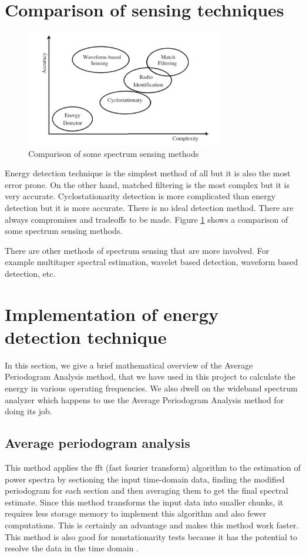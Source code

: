 \section{Comparison of sensing techniques}

\begin{figure}
\centering
\includegraphics[width=0.77\textwidth]{../images/compareSensing}
\caption[Comparison of sensing methods]{Comparison of some spectrum sensing 
methods}
\label{compareSensing}
\end{figure}

Energy detection technique is the simplest method of all but it is also the 
most error prone. On the other hand, matched filtering is the most complex but 
it is very accurate. Cyclostationarity detection is more complicated than 
energy detection but it is more accurate. There is no ideal detection method.
There are always compromises and tradeoffs to be made. Figure 
\ref{compareSensing} shows a comparison of some spectrum sensing methods.

There are other methods of spectrum sensing that are more involved. For
example multitaper spectral estimation, wavelet based detection, waveform
based detection, etc.


\section{Implementation of energy detection technique}

In this section, we give a brief mathematical overview of the Average 
Periodogram Analysis method, that we have used in this project to calculate 
the energy in various operating frequencies. We also dwell on the wideband 
spectrum analyzer which happens to use the Average Periodogram Analysis 
method for doing its job.

\subsection{Average periodogram analysis}
This method applies the \gls{fft}  (fast fourier transform) algorithm to the 
estimation of power spectra by sectioning the input time-domain data, finding
the modified periodogram for each section and then averaging them to get the
final spectral estimate. Since this method transforms the input data into 
smaller chunks, it requires less storage memory to implement this algorithm 
and also fewer computations. This is certainly an advantage and makes this 
method work faster. This method is also good for nonstationarity tests because
it has the potential to resolve the data in the time domain \cite{welch67}.

